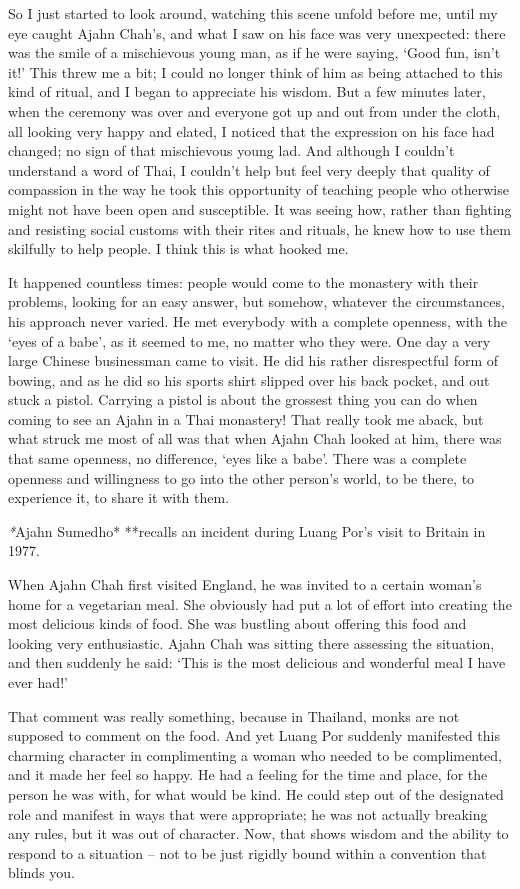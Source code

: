So I just started to look around, watching this scene unfold before me,
until my eye caught Ajahn Chah's, and what I saw on his face was very
unexpected: there was the smile of a mischievous young man, as if he
were saying, `Good fun, isn't it!' This threw me a bit; I could no
longer think of him as being attached to this kind of ritual, and I
began to appreciate his wisdom. But a few minutes later, when the
ceremony was over and everyone got up and out from under the cloth, all
looking very happy and elated, I noticed that the expression on his face
had changed; no sign of that mischievous young lad. And although I
couldn't understand a word of Thai, I couldn't help but feel very deeply
that quality of compassion in the way he took this opportunity of
teaching people who otherwise might not have been open and susceptible.
It was seeing how, rather than fighting and resisting social customs
with their rites and rituals, he knew how to use them skilfully to help
people. I think this is what hooked me.

It happened countless times: people would come to the monastery with
their problems, looking for an easy answer, but somehow, whatever the
circumstances, his approach never varied. He met everybody with a
complete openness, with the `eyes of a babe', as it seemed to me, no
matter who they were. One day a very large Chinese businessman came to
visit. He did his rather disrespectful form of bowing, and as he did so
his sports shirt slipped over his back pocket, and out stuck a pistol.
Carrying a pistol is about the grossest thing you can do when coming to
see an Ajahn in a Thai monastery! That really took me aback, but what
struck me most of all was that when Ajahn Chah looked at him, there was
that same openness, no difference, `eyes like a babe'. There was a
complete openness and willingness to go into the other person's world,
to be there, to experience it, to share it with them.

\emph{*}Ajahn Sumedho* **recalls an incident during Luang Por's visit to
Britain in 1977.

When Ajahn Chah first visited England, he was invited to a certain
woman's home for a vegetarian meal. She obviously had put a lot of
effort into creating the most delicious kinds of food. She was bustling
about offering this food and looking very enthusiastic. Ajahn Chah was
sitting there assessing the situation, and then suddenly he said: `This
is the most delicious and wonderful meal I have ever had!'

That comment was really something, because in Thailand, monks are not
supposed to comment on the food. And yet Luang Por suddenly manifested
this charming character in complimenting a woman who needed to be
complimented, and it made her feel so happy. He had a feeling for the
time and place, for the person he was with, for what would be kind. He
could step out of the designated role and manifest in ways that were
appropriate; he was not actually breaking any rules, but it was out of
character. Now, that shows wisdom and the ability to respond to a
situation -- not to be just rigidly bound within a convention that
blinds you.

